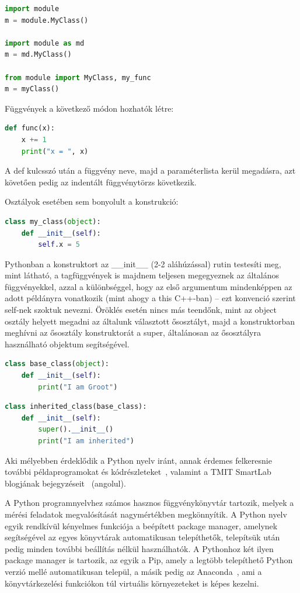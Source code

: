\documentclass[12pt,a4paper,oneside]{report}             %
\begin{document}
\begin{lstlisting}[language=Python]
import module
m = module.MyClass()

import module as md
m = md.MyClass()

from module import MyClass, my_func
m = myClass()
\end{lstlisting}

Függvények a következő módon hozhatók létre:

\begin{lstlisting}[language=Python]
def func(x):
	x += 1
	print("x = ", x)
\end{lstlisting}

A def kulcsszó után a függvény neve, majd a paraméterlista kerül megadásra, azt követően pedig az indentált függvénytörzs következik.

Osztályok esetében sem bonyolult a konstrukció:

\begin{lstlisting}[language=Python]
class my_class(object):
	def __init__(self):
		self.x = 5
\end{lstlisting}

Pythonban a konstruktort az \_\_init\_\_ (2-2 aláhúzással) rutin testesíti meg, mint látható, a tagfüggvények is majdnem teljesen megegyeznek az általános függvényekkel, azzal a különbséggel, hogy az első argumentum mindenképpen az adott példányra vonatkozik (mint ahogy a this C++-ban) – ezt konvenció szerint self-nek szoktuk nevezni.
Öröklés esetén nincs más teendőnk, mint az object osztály helyett megadni az általunk választott ősosztályt, majd a konstruktorban meghívni az ősosztály konstruktorát a super, általánosan az ősosztályra használható objektum segítségével.

\begin{lstlisting}[language=Python]
class base_class(object):
	def __init__(self):
		print("I am Groot")
\end{lstlisting}

\begin{lstlisting}[language=Python]
class inherited_class(base_class):
	def __init__(self):
		super().__init__()
		print("I am inherited")
\end{lstlisting}

Aki mélyebben érdeklődik a Python nyelv iránt, annak érdemes felkeresnie további példaprogramokat és kódrészleteket~\cite{gist}, valamint a TMIT SmartLab blogjának bejegyzéseit~\cite{smart1,smart2} (angolul). 

A Python programnyelvhez számos hasznos függvénykönyvtár tartozik, melyek a mérési feladatok megvalósítását nagymértékben megkönnyítik. A Python nyelv egyik rendkívül kényelmes funkciója a beépített package manager, amelynek segítségével az egyes könyvtárak automatikusan telepíthetők, telepítsük után pedig minden további beállítás nélkül használhatók. A Pythonhoz két ilyen package manager is tartozik, az egyik a Pip, amely a legtöbb telepíthető Python verzió mellé automatikusan települ, a másik pedig az Anaconda~\cite{conda}, ami a könyvtárkezelési funkciókon túl virtuális környezeteket is képes kezelni.
\end{document}
